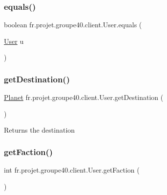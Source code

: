 \subsubsection{\texorpdfstring{equals()}{equals()}}
{\footnotesize\ttfamily boolean fr.\+projet.\+groupe40.\+client.\+User.\+equals (\begin{DoxyParamCaption}\item[{\hyperlink{classfr_1_1projet_1_1groupe40_1_1client_1_1_user}{User}}]{u }\end{DoxyParamCaption})}

\mbox{\label{classfr_1_1projet_1_1groupe40_1_1client_1_1_user_a9e98177d60b2cde17b9b41a37ba940ed}} 
\subsubsection{\texorpdfstring{get\+Destination()}{getDestination()}}
{\footnotesize\ttfamily \hyperlink{classfr_1_1projet_1_1groupe40_1_1model_1_1board_1_1_planet}{Planet} fr.\+projet.\+groupe40.\+client.\+User.\+get\+Destination (\begin{DoxyParamCaption}{ }\end{DoxyParamCaption})}

\begin{DoxyReturn}{Returns}
the destination 
\end{DoxyReturn}
\mbox{\label{classfr_1_1projet_1_1groupe40_1_1client_1_1_user_a8bba484aaed66955962f9ebae579286d}} 
\subsubsection{\texorpdfstring{get\+Faction()}{getFaction()}}
{\footnotesize\ttfamily int fr.\+projet.\+groupe40.\+client.\+User.\+get\+Faction (\begin{DoxyParamCaption}{ }\end{DoxyParamCaption})}

